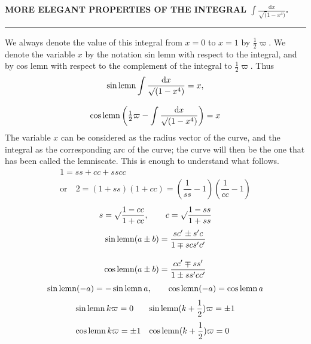 \begingroup
\renewcommand{\arraystretch}{1.45}
\clearpage{}

\begin{center}
\textbf{MORE ELEGANT PROPERTIES OF THE INTEGRAL $\displaystyle\int\frac{\mathrm{d}x}{\surd(1-x^4)}$.}
\end{center}
\par\begin{center}\rule{.22\linewidth}{.3pt}\end{center}
We always denote the value of this integral from $x=0$ to $x=1$ by $\frac12\varpi$. We denote the variable $x$ by the notation sin lemn with respect to the integral, and by cos lemn with respect to the complement of the integral to $\frac12\varpi$. Thus
\[
\begin{gathered}\operatorname{sin\,lemn}\int\dfrac{\mathrm{d}x}{\surd(1-x^4)}=x,\\[8pt]
\operatorname{cos\,lemn}\left(\tfrac12\varpi-\int\dfrac{\mathrm{d}x}{\surd(1-x^4)}\right)=x\end{gathered}
\]
The variable $x$ can be considered as the radius vector of the curve, and the integral as the corresponding arc of the curve; the curve will then be the one that has been called the lemniscate. This is enough to understand what follows.
\[
\begin{gathered}1=ss+cc+sscc\\[6pt]\text{or}\quad
2=(1+ss)(1+cc)=\left(\dfrac1{ss}-1\right)\left(\dfrac1{cc}-1\right)\end{gathered}
\]
\[
s=\surd\dfrac{1-cc}{1+cc},\qquad c=\surd\dfrac{1-ss}{1+ss}
\]
\[
\begin{aligned}
\operatorname{sin\,lemn}(a\pm b)&=\dfrac{sc'\pm s'c}{1\mp scs'c'}\\[10pt]
\operatorname{cos\,lemn}(a\pm b)&=\dfrac{cc'\mp ss'}{1\pm ss'cc'}
\end{aligned}
\]
\[
\operatorname{sin\,lemn}(-a)=-\operatorname{sin\,lemn} a,\qquad \operatorname{cos\,lemn}(-a)=\operatorname{cos\,lemn} a
\]
\[
\begin{array}{ll}
\operatorname{sin\,lemn} k\varpi=0&\operatorname{sin\,lemn}(k+\dfrac12)\varpi=\pm1\\[10pt]
\operatorname{cos\,lemn} k\varpi=\pm1&\operatorname{cos\,lemn}(k+\dfrac12)\varpi=0
\end{array}
\]


